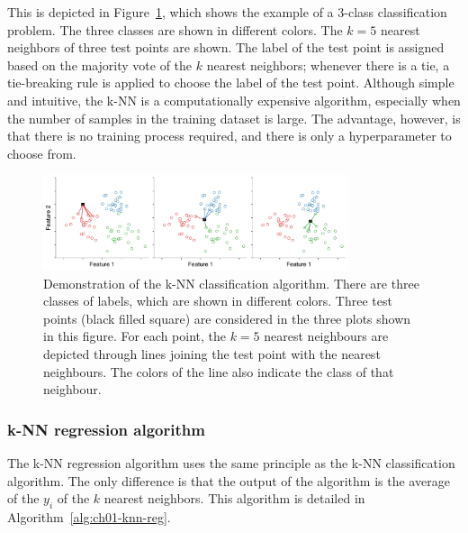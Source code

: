 This is depicted in Figure~\ref{fig:ch01-knn-demo}, which shows the example of a 3-class classification problem. The three classes are shown in different colors. The $k=5$ nearest neighbors of three test points are shown. The label of the test point is assigned based on the majority vote of the $k$ nearest neighbors; whenever there is a tie, a tie-breaking rule is applied to choose the label of the test point. Although simple and intuitive, the k-NN is a computationally expensive algorithm, especially when the number of samples in the training dataset is large. The advantage, however, is that there is no training process required, and there is only a hyperparameter to choose from.

\begin{figure}
    \centering
    \includegraphics[width=0.8\textwidth]{figure/chapter01/knn.pdf}
    \caption{Demonstration of the k-NN classification algorithm. There are three classes of labels, which are shown in different colors. Three test points (black filled square) are considered in the three plots shown in this figure. For each point, the $k=5$ nearest neighbours are depicted through lines joining the test point with the nearest neighbours. The colors of the line also indicate the class of that neighbour.}
    \label{fig:ch01-knn-demo}
\end{figure}

\subsubsection{k-NN regression algorithm}
The k-NN regression algorithm uses the same principle as the k-NN classification algorithm. The only difference is that the output of the algorithm is the average of the $y_i$ of the $k$ nearest neighbors. This algorithm is detailed in Algorithm~\ref{alg:ch01-knn-reg}.

